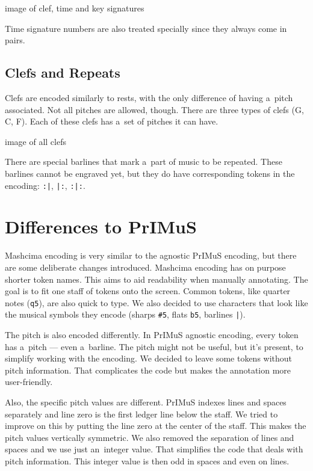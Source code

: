 \begin{code}
image of clef, time and key signatures
\end{code}

Time signature numbers are also treated specially since they always come in pairs.


\subsection{Clefs and Repeats}

Clefs are encoded similarly to rests, with the only difference of having a~pitch associated. Not all pitches are allowed, though. There are three types of clefs (G, C, F). Each of these clefs has a~set of pitches it can have.

\begin{code}
image of all clefs
\end{code}

There are special barlines that mark a~part of music to be repeated. These barlines cannot be engraved yet, but they do have corresponding tokens in the encoding: \verb`:|`, \verb`|:`, \verb`:|:`.


\section{Differences to PrIMuS}

Mashcima encoding is very similar to the agnostic PrIMuS encoding, but there are some deliberate changes introduced. Mashcima encoding has on purpose shorter token names. This aims to aid readability when manually annotating. The goal is to fit one staff of tokens onto the screen. Common tokens, like quarter notes (\verb`q5`), are also quick to type. We also decided to use characters that look like the musical symbols they encode (sharps \verb`#5`, flats \verb`b5`, barlines \verb`|`).

The pitch is also encoded differently. In PrIMuS agnostic encoding, every token has a~pitch --- even a~barline. The pitch might not be useful, but it's present, to simplify working with the encoding. We decided to leave some tokens without pitch information. That complicates the code but makes the annotation more user-friendly.

Also, the specific pitch values are different. PrIMuS indexes lines and spaces separately and line zero is the first ledger line below the staff. We tried to improve on this by putting the line zero at the center of the staff. This makes the pitch values vertically symmetric. We also removed the separation of lines and spaces and we use just an~integer value. That simplifies the code that deals with pitch information. This integer value is then odd in spaces and even on lines.


